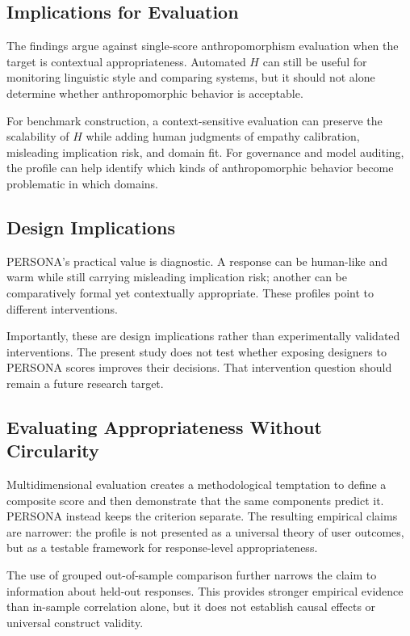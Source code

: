 \documentclass[manuscript,review,anonymous]{acmart}
\begin{document}
\subsection{Implications for Evaluation}

The findings argue against single-score anthropomorphism evaluation when the target is contextual appropriateness. Automated $H$ can still be useful for monitoring linguistic style and comparing systems, but it should not alone determine whether anthropomorphic behavior is acceptable.

For benchmark construction, a context-sensitive evaluation can preserve the scalability of $H$ while adding human judgments of empathy calibration, misleading implication risk, and domain fit. For governance and model auditing, the profile can help identify which kinds of anthropomorphic behavior become problematic in which domains.

\subsection{Design Implications}

PERSONA's practical value is diagnostic. A response can be human-like and warm while still carrying misleading implication risk; another can be comparatively formal yet contextually appropriate. These profiles point to different interventions.

Importantly, these are design implications rather than experimentally validated interventions. The present study does not test whether exposing designers to PERSONA scores improves their decisions. That intervention question should remain a future research target.

\subsection{Evaluating Appropriateness Without Circularity}

Multidimensional evaluation creates a methodological temptation to define a composite score and then demonstrate that the same components predict it. PERSONA instead keeps the criterion separate. The resulting empirical claims are narrower: the profile is not presented as a universal theory of user outcomes, but as a testable framework for response-level appropriateness.

The use of grouped out-of-sample comparison further narrows the claim to information about held-out responses. This provides stronger empirical evidence than in-sample correlation alone, but it does not establish causal effects or universal construct validity.
\end{document}
